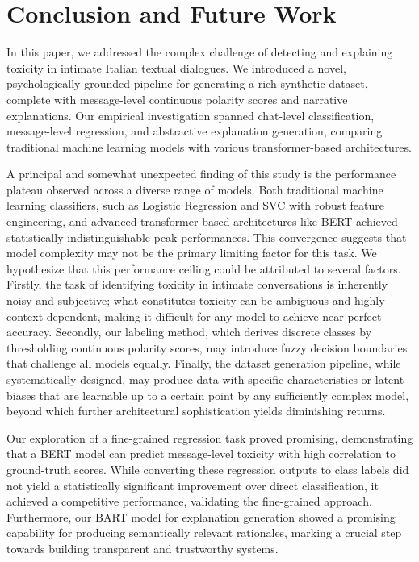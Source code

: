 \documentclass[twocolumn]{ceurart}
\begin{document}
\section{Conclusion and Future Work}

In this paper, we addressed the complex challenge of detecting and explaining toxicity in intimate Italian textual dialogues. We introduced a novel, psychologically-grounded pipeline for generating a rich synthetic dataset, complete with message-level continuous polarity scores and narrative explanations. Our empirical investigation spanned chat-level classification, message-level regression, and abstractive explanation generation, comparing traditional machine learning models with various transformer-based architectures.

A principal and somewhat unexpected finding of this study is the performance plateau observed across a diverse range of models. Both traditional machine learning classifiers, such as Logistic Regression and SVC with robust feature engineering, and advanced transformer-based architectures like BERT achieved statistically indistinguishable peak performances. This convergence suggests that model complexity may not be the primary limiting factor for this task. We hypothesize that this performance ceiling could be attributed to several factors. Firstly, the task of identifying toxicity in intimate conversations is inherently noisy and subjective; what constitutes toxicity can be ambiguous and highly context-dependent, making it difficult for any model to achieve near-perfect accuracy. Secondly, our labeling method, which derives discrete classes by thresholding continuous polarity scores, may introduce fuzzy decision boundaries that challenge all models equally. Finally, the dataset generation pipeline, while systematically designed, may produce data with specific characteristics or latent biases that are learnable up to a certain point by any sufficiently complex model, beyond which further architectural sophistication yields diminishing returns.

Our exploration of a fine-grained regression task proved promising, demonstrating that a BERT model can predict message-level toxicity with high correlation to ground-truth scores. While converting these regression outputs to class labels did not yield a statistically significant improvement over direct classification, it achieved a competitive performance, validating the fine-grained approach. Furthermore, our BART model for explanation generation showed a promising capability for producing semantically relevant rationales, marking a crucial step towards building transparent and trustworthy systems.
\end{document}

